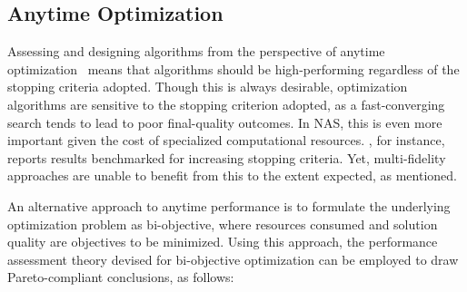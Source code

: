 \subsection{Anytime Optimization}

Assessing and designing algorithms from the perspective of anytime
optimization~\cite{LopStu2013ejor} means that algorithms should be high-performing regardless
of the stopping criteria adopted. Though this is always desirable, 
optimization algorithms are sensitive to the stopping
criterion adopted, as a fast-converging search tends to lead to poor
final-quality outcomes. In NAS, this is even more important given the
cost of specialized computational resources. \nasbench, for instance,  
reports results benchmarked for increasing stopping criteria. Yet, multi-fidelity
approaches are unable to benefit from this to the extent expected, as mentioned.

An alternative approach to anytime performance is to formulate the 
underlying optimization problem as bi-objective, where resources consumed
and solution quality are objectives to be minimized. Using this approach, the performance assessment theory
devised for bi-objective optimization can be employed to draw Pareto-compliant
conclusions, as follows:

